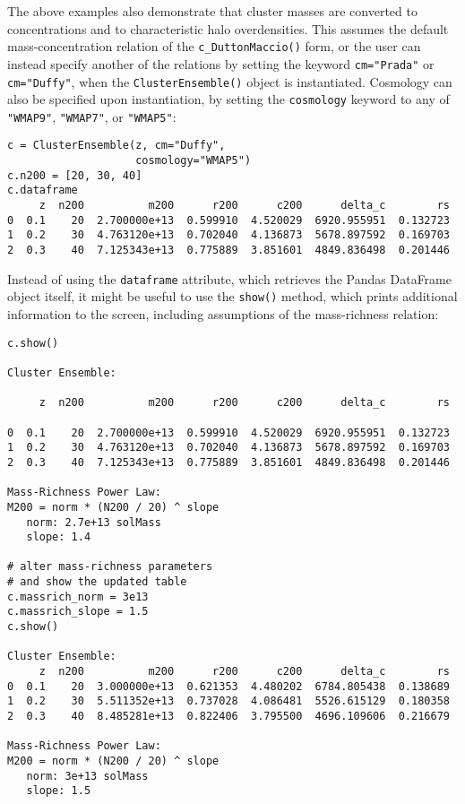 \documentclass{emulateapj}
\newcommand{\code}{\lstinline[style=codeintext]}
\begin{document}
The above examples also demonstrate that cluster masses are converted to concentrations and to characteristic halo overdensities. This assumes the default mass-concentration relation of the \code{c_DuttonMaccio()} form, or the user can instead specify another of the relations by setting the keyword \code{cm="Prada"} or \code{cm="Duffy"}, when the \code{ClusterEnsemble()} object is instantiated. Cosmology can also be specified upon instantiation, by setting the \code{cosmology} keyword to any of \code{"WMAP9"}, \code{"WMAP7"}, or \code{"WMAP5"}:
\begin{lstlisting}
c = ClusterEnsemble(z, cm="Duffy", 
                    cosmology="WMAP5")
c.n200 = [20, 30, 40]
c.dataframe
     z  n200          m200      r200      c200      delta_c        rs
0  0.1    20  2.700000e+13  0.599910  4.520029  6920.955951  0.132723
1  0.2    30  4.763120e+13  0.702040  4.136873  5678.897592  0.169703
2  0.3    40  7.125343e+13  0.775889  3.851601  4849.836498  0.201446
\end{lstlisting}
Instead of using the \code{dataframe} attribute, which retrieves the Pandas DataFrame object itself, it might be useful to use the \code{show()} method, which prints additional information to the screen, including assumptions of the mass-richness relation:
\begin{lstlisting}
c.show()

Cluster Ensemble:

     z  n200          m200      r200      c200      delta_c        rs

0  0.1    20  2.700000e+13  0.599910  4.520029  6920.955951  0.132723
1  0.2    30  4.763120e+13  0.702040  4.136873  5678.897592  0.169703
2  0.3    40  7.125343e+13  0.775889  3.851601  4849.836498  0.201446

Mass-Richness Power Law:
M200 = norm * (N200 / 20) ^ slope
   norm: 2.7e+13 solMass
   slope: 1.4

# alter mass-richness parameters
# and show the updated table
c.massrich_norm = 3e13
c.massrich_slope = 1.5
c.show()

Cluster Ensemble:
     z  n200          m200      r200      c200      delta_c        rs
0  0.1    20  3.000000e+13  0.621353  4.480202  6784.805438  0.138689
1  0.2    30  5.511352e+13  0.737028  4.086481  5526.615129  0.180358
2  0.3    40  8.485281e+13  0.822406  3.795500  4696.109606  0.216679

Mass-Richness Power Law:
M200 = norm * (N200 / 20) ^ slope
   norm: 3e+13 solMass
   slope: 1.5

\end{lstlisting}
\end{document}
